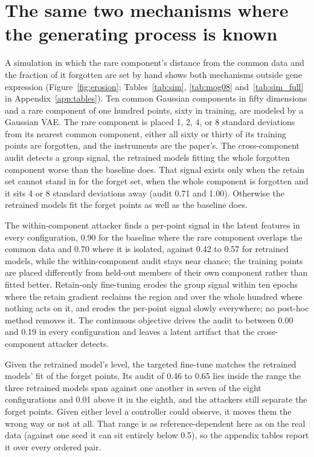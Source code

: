 \documentclass{article}
\begin{document}
\section{The same two mechanisms where the generating process is known}
\label{app:simulation}

A simulation in which the rare component's distance from the common data and the fraction of it forgotten are set by hand shows both mechanisms outside gene expression (Figure~\ref{fig:erosion}; Tables~\ref{tab:sim}, \ref{tab:mog08} and~\ref{tab:sim_full} in Appendix~\ref{app:tables}). Ten common Gaussian components in fifty dimensions and a rare component of one hundred points, sixty in training, are modeled by a Gaussian VAE. The rare component is placed 1, 2, 4, or 8 standard deviations from its nearest common component, either all sixty or thirty of its training points are forgotten, and the instruments are the paper's. The cross-component audit detects a group signal, the retrained models fitting the whole forgotten component worse than the baseline does. That signal exists only when the retain set cannot stand in for the forget set, when the whole component is forgotten and it sits 4 or 8 standard deviations away (audit 0.71 and 1.00). Otherwise the retrained models fit the forget points as well as the baseline does.

The within-component attacker finds a per-point signal in the latent features in every configuration, 0.90 for the baseline where the rare component overlaps the common data and 0.70 where it is isolated, against 0.42 to 0.57 for retrained models, while the within-component audit stays near chance; the training points are placed differently from held-out members of their own component rather than fitted better. Retain-only fine-tuning erodes the group signal within ten epochs where the retain gradient reclaims the region and over the whole hundred where nothing acts on it, and erodes the per-point signal slowly everywhere; no post-hoc method removes it. The continuous objective drives the audit to between 0.00 and 0.19 in every configuration and leaves a latent artifact that the cross-component attacker detects.

Given the retrained model's level, the targeted fine-tune matches the retrained models' fit of the forget points. Its audit of 0.46 to 0.65 lies inside the range the three retrained models span against one another in seven of the eight configurations and 0.01 above it in the eighth, and the attackers still separate the forget points. Given either level a controller could observe, it moves them the wrong way or not at all. That range is as reference-dependent here as on the real data (against one seed it can sit entirely below 0.5), so the appendix tables report it over every ordered pair.
\end{document}
